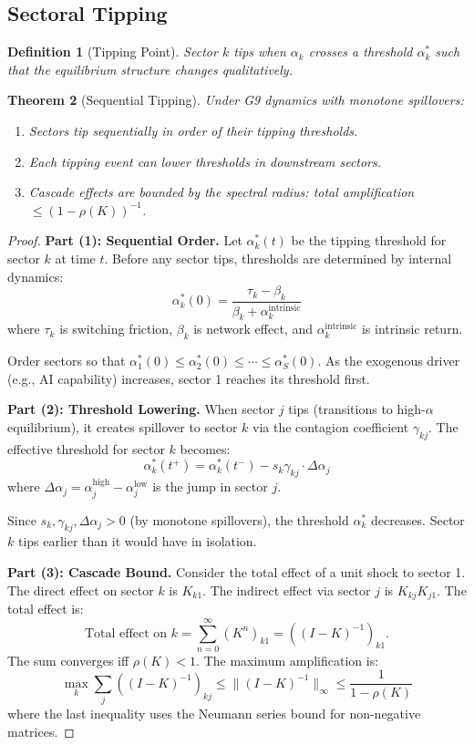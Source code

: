 \documentclass[12pt]{article}
\newtheorem{theorem}{Theorem}[section]
\newtheorem{definition}[theorem]{Definition}
\begin{document}
\subsection{Sectoral Tipping}

\begin{definition}[Tipping Point]
Sector $k$ \emph{tips} when $\alpha_k$ crosses a threshold $\alpha_k^*$ such that the equilibrium structure changes qualitatively.
\end{definition}

\begin{theorem}[Sequential Tipping]
\label{thm:sequential-tipping}
Under G9 dynamics with monotone spillovers:
\begin{enumerate}
    \item Sectors tip sequentially in order of their tipping thresholds.
    \item Each tipping event can lower thresholds in downstream sectors.
    \item Cascade effects are bounded by the spectral radius: total amplification $\leq (1 - \rho(K))^{-1}$.
\end{enumerate}
\end{theorem}

\begin{proof}
\textbf{Part (1): Sequential Order.}
Let $\alpha_k^*(t)$ be the tipping threshold for sector $k$ at time $t$. Before any sector tips, thresholds are determined by internal dynamics:
\[
\alpha_k^*(0) = \frac{\tau_k - \beta_k}{\beta_k + \alpha_k^{\text{intrinsic}}}
\]
where $\tau_k$ is switching friction, $\beta_k$ is network effect, and $\alpha_k^{\text{intrinsic}}$ is intrinsic return.

Order sectors so that $\alpha_1^*(0) \leq \alpha_2^*(0) \leq \cdots \leq \alpha_S^*(0)$. As the exogenous driver (e.g., AI capability) increases, sector 1 reaches its threshold first.

\textbf{Part (2): Threshold Lowering.}
When sector $j$ tips (transitions to high-$\alpha$ equilibrium), it creates spillover to sector $k$ via the contagion coefficient $\gamma_{kj}$. The effective threshold for sector $k$ becomes:
\[
\alpha_k^*(t^+) = \alpha_k^*(t^-) - s_k \gamma_{kj} \cdot \Delta \alpha_j
\]
where $\Delta \alpha_j = \alpha_j^{\text{high}} - \alpha_j^{\text{low}}$ is the jump in sector $j$.

Since $s_k, \gamma_{kj}, \Delta \alpha_j > 0$ (by monotone spillovers), the threshold $\alpha_k^*$ decreases. Sector $k$ tips earlier than it would have in isolation.

\textbf{Part (3): Cascade Bound.}
Consider the total effect of a unit shock to sector 1. The direct effect on sector $k$ is $K_{k1}$. The indirect effect via sector $j$ is $K_{kj} K_{j1}$. The total effect is:
\[
\text{Total effect on } k = \sum_{n=0}^\infty (K^n)_{k1} = ((I - K)^{-1})_{k1}.
\]
The sum converges iff $\rho(K) < 1$. The maximum amplification is:
\[
\max_k \sum_{j} ((I - K)^{-1})_{kj} \leq \|(I - K)^{-1}\|_{\infty} \leq \frac{1}{1 - \rho(K)}
\]
where the last inequality uses the Neumann series bound for non-negative matrices.
\end{proof}
\end{document}
